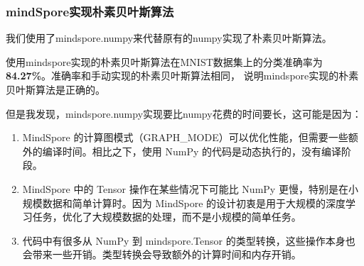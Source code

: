 \documentclass[12pt]{article}
\begin{document}







\subsubsection{mindSpore实现朴素贝叶斯算法}
我们使用了mindspore.numpy来代替原有的numpy实现了朴素贝叶斯算法。

使用mindspore实现的朴素贝叶斯算法在MNIST数据集上的分类准确率为\textbf{84.27\%}。准确率和手动实现的朴素贝叶斯算法相同，
说明mindspore实现的朴素贝叶斯算法是正确的。

但是我发现，mindspore.numpy实现要比numpy花费的时间要长，这可能是因为：
\begin{enumerate}
  \item MindSpore 的计算图模式（GRAPH\_MODE）可以优化性能，但需要一些额外的编译时间。相比之下，使用 NumPy 的代码是动态执行的，没有编译阶段。
  \item MindSpore 中的 Tensor 操作在某些情况下可能比 NumPy 更慢，特别是在小规模数据和简单计算时。因为 MindSpore 的设计初衷是用于大规模的深度学习任务，优化了大规模数据的处理，而不是小规模的简单任务。
  \item 代码中有很多从 NumPy 到 mindspore.Tensor 的类型转换，这些操作本身也会带来一些开销。类型转换会导致额外的计算时间和内存开销。
\end{enumerate}
\end{document}
